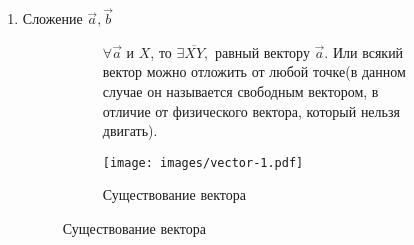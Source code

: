 \begin{enumerate}
	\item Сложение \(\vec{a}, \vec{b}\) \\
	\begin{figure}[h]
		\begin{subfigure}[b]{0.6\linewidth}
			\begin{note}
				\(\forall \vec{a} \) и $X$, то \(\exists \overline{XY},\) равный вектору \(\vec{a}\). 
				Или всякий вектор можно отложить от любой точке(в данном случае он называется свободным вектором, в отличие от физического вектора, который нельзя двигать).
			\end{note}
		\end{subfigure}
		\begin{subfigure}[b]{0.45\linewidth}
				\centering
				\texttt{[image: images/vector-1.pdf]}
				\caption*{Существование вектора}
				\label{Vector1}
		\end{subfigure}
	\end{figure}
	

\end{enumerate}
